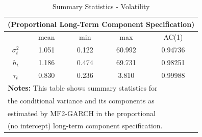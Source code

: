 \documentclass[12pt]{article}
\begin{document}
\pagebreak
\restoregeometry
\begin{table}[!ht]
\centering
\caption{Summary Statistics - Volatility}
\begin{tabular}{ccccc}
\multicolumn{5}{c}{(Proportional Long-Term Component Specification)}\\
\midrule
\midrule
\mbox{} & mean & min & max & AC(1)\\
\midrule
\mbox{$\sigma^2_t$}& 1.051 & 0.122 & 60.992 & 0.94736\\
\mbox{$h_t$} & 1.186 & 0.474 & 69.731 & 0.98251\\
\mbox{$\tau_t$} & 0.830 & 0.236 & 3.810 & 0.99988\\
\midrule
\multicolumn{5}{l}{\textbf{Notes:} This table shows summary statistics for}\\
\multicolumn{5}{l}{the conditional variance and its components as}\\
\multicolumn{5}{l}{estimated by MF2-GARCH in the proportional}\\
\multicolumn{5}{l}{(no intercept) long-term component specification.}\\
\midrule
\midrule
\end{tabular}
\end{table}
\end{document}

